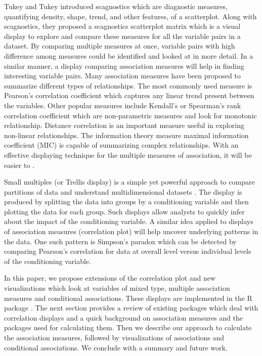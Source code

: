 Tukey and Tukey \citep{tukey1985computer} introduced scagnostics which
are diagnostic measures, quantifying density, shape, trend, and other
features, of a scatterplot. Along with scagnostics, they proposed a
scagnostics scatterplot matrix which is a visual display to explore and
compare these measures for all the variable pairs in a dataset. By
comparing multiple measures at once, variable pairs with high difference
among measures could be identified and looked at in more detail. In a
similar manner, a display comparing association measures will help in
finding interesting variable pairs. Many association measures have been
proposed to summarize different types of relationships. The most
commonly used measure is Pearson's correlation coefficient which
captures any linear trend present between the variables. Other popular
measures include Kendall's or Spearman's rank correlation coefficient
which are non-parametric measures and look for monotonic relationship.
Distance correlation \citep{szekely2007measuring} is an important
measure useful in exploring non-linear relationships. The information
theory measure maximal information coefficient (MIC)
\citep{reshef2011detecting} is capable of summarizing complex
relationships. With an effective displaying technique for the multiple
measures of association, it will be easier to .

Small multiples (or Trellis display) is a simple yet powerful approach
to compare partitions of data and understand multidimensional datasets
\citep{tufte1986thevisual}. The display is produced by splitting the
data into groups by a conditioning variable and then plotting the data
for each group. Such displays allow analysts to quickly infer about the
impact of the conditioning variable. A similar idea applied to displays
of association measures (correlation plot) will help uncover underlying
patterns in the data. One such pattern is Simpson's paradox which can be
detected by comparing Pearson's correlation for data at overall level
versus individual levels of the conditioning variable.

In this paper, we propose extensions of the correlation plot and new
visualizations which look at variables of mixed type, multiple
association measures and conditional associations. These displays are
implemented in the R package . The next section provides
a review of existing packages which deal with correlation displays and a
quick background on association measures and the packages used for
calculating them. Then we describe our approach to calculate the
association measures, followed by visualizations of associations and
conditional associations. We conclude with a summary and future work.

